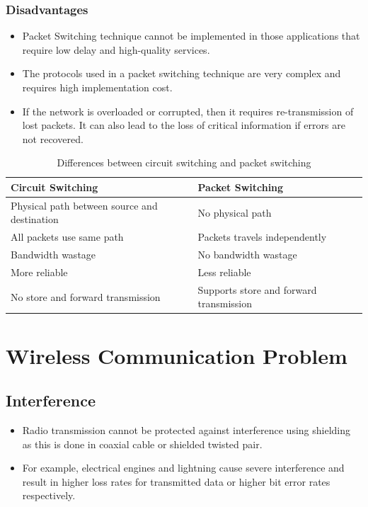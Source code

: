 \begin{multicols}{2}
	\subsubsection*{Disadvantages}
	\begin{itemize}
		\item Packet Switching technique cannot be implemented in those applications that require low delay and high-quality services.
		\item The protocols used in a packet switching technique are very complex and requires high implementation cost.
		\item If the network is overloaded or corrupted, then it requires re-transmission of lost packets. It can also lead to the loss of critical information if errors are not recovered.
	\end{itemize}
\end{multicols}


\begin{table}[hpt!]
	\centering
	\caption{Differences between circuit switching and packet switching}
	\label{tab:circut-vs-packet}
	\begin{center}
		\begin{tabular}{p{5cm}p{5cm}}
		\toprule	
		\textbf{Circuit Switching}	& \textbf{ Packet Switching} \\
		
		\midrule
		Physical path between source and destination	& No physical path\\
		All packets use same path & Packets travels independently \\
		Bandwidth wastage & No bandwidth wastage	\\
		More reliable & Less reliable\\
		No store and forward transmission	& Supports store and forward transmission\\
		\bottomrule
	\end{tabular}
	\end{center}
\end{table}

\section{Wireless Communication Problem}

\subsection{Interference}
\begin{itemize}
	\item Radio transmission cannot be protected against interference using shielding as this is done in coaxial cable or shielded twisted pair. 
	\item For example, electrical engines and lightning cause severe interference and result in higher loss rates for transmitted data or higher bit error rates respectively.
\end{itemize}


